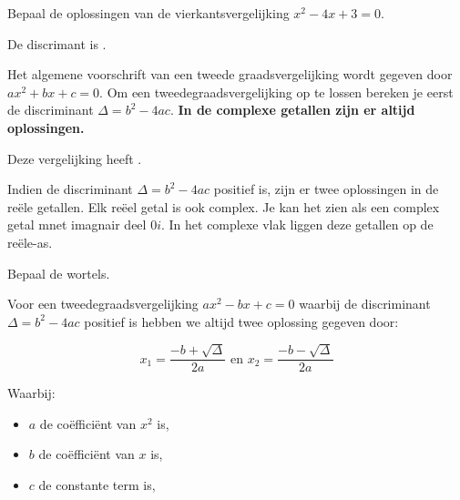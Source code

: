 \documentclass{ximera}
\begin{document}
\begin{exercise}

    Bepaal de oplossingen van de vierkantsvergelijking \(x^2 - 4x + 3 = 0\).   
    
    \begin{question}
    De discrimant is \choicepositief. 
    
    \begin{feedback}
        Het algemene voorschrift van een tweede graadsvergelijking wordt gegeven door  \(ax^2 + bx + c = 0\). 
        Om een tweedegraadsvergelijking op te lossen bereken je eerst de discriminant \(\Delta = b^2 - 4ac\). 
        \textbf{In de complexe getallen zijn er altijd oplossingen.}
        
    \end{feedback}
    \end{question}
    
    \begin{question}
        Deze vergelijking heeft \choicetweer.
        \begin{feedback}
            Indien de discriminant \(\Delta = b^2 - 4ac\) positief is, zijn er twee oplossingen in de reële getallen. Elk reëel getal is ook complex. Je kan het zien als een complex getal mnet imagnair deel \(0i\). In het complexe vlak liggen deze getallen op de reële-as.  
        \end{feedback}
    \end{question}
    
    \begin{question}
        Bepaal de wortels. 
        
        \begin{hint}
            
            Voor een tweedegraadsvergelijking  \(ax^2 - bx + c = 0\) waarbij de discriminant \( \Delta = b^2 - 4ac \) positief is hebben we altijd twee oplossing gegeven door: 
            
            \[
                x_{1} = \frac{-b + \sqrt{\Delta}}{2a}  \text{ en }  x_{2} = \frac{-b - \sqrt{\Delta}}{2a}
                \]
                
                Waarbij:
                \begin{itemize}
                    \item \( a \) de coëfficiënt van \( x^2 \) is,
                    \item \( b \) de coëfficiënt van \( x \) is,
                    \item \( c \) de constante term is,
                \end{itemize}
                

\end{hint}
\end{question}
\end{exercise}
\end{document}
